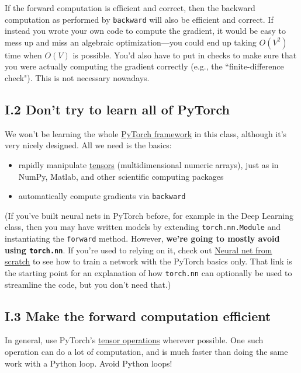 \documentclass[12pt]{article}
\theoremstyle{plain}
\theoremstyle{definition}
\theoremstyle{remark}
\begin{document}
If the forward computation is efficient and correct, then the backward computation as performed by \texttt{backward} will also be efficient and correct. If instead you wrote your own code to compute the gradient, it would be easy to mess up and miss an algebraic optimization—you could end up taking $O(V^2)$ time when $O(V)$ is possible. You’d also have to put in checks to make sure that you were actually computing the gradient correctly (e.g., the ``finite-difference check"). This is not necessary nowadays.

\subsection*{I.2 Don’t try to learn all of PyTorch}

We won’t be learning the whole \href{https://pytorch.org}{PyTorch framework} in this class, although it’s very nicely designed. All we need is the basics:
\begin{itemize}
    \item rapidly manipulate \href{https://pytorch.org/docs/stable/tensors.html}{tensors} (multidimensional numeric arrays), just as in NumPy, Matlab, and other scientific computing packages
    \item automatically compute gradients via \texttt{backward}
\end{itemize}

(If you’ve built neural nets in PyTorch before, for example in the Deep Learning class, then you may have written models by extending \texttt{torch.nn.Module} and instantiating the \texttt{forward} method. However, \textbf{we’re going to mostly avoid using \texttt{torch.nn}}. If you’re used to relying on it, check out \href{https://pytorch.org/tutorials/beginner/nn_tutorial.html}{Neural net from scratch} to see how to train a network with the PyTorch basics only. That link is the starting point for an explanation of how \texttt{torch.nn} can optionally be used to streamline the code, but you don’t need that.)

\subsection*{I.3 Make the forward computation efficient}

In general, use PyTorch’s \href{https://pytorch.org/docs/stable/tensors.html\#torch.Tensor}{tensor operations} wherever possible. One such operation can do a lot of computation, and is much faster than doing the same work with a Python loop. Avoid Python loops!
\end{document}
